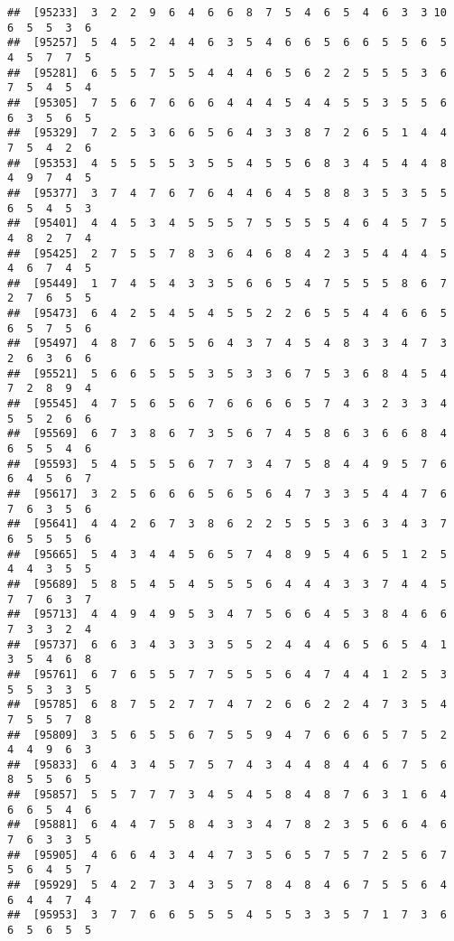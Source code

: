 \documentclass[
]{book}
\begin{document}
\begin{verbatim}
##  [95233]  3  2  2  9  6  4  6  6  8  7  5  4  6  5  4  6  3  3 10  6  5  5  3  6
##  [95257]  5  4  5  2  4  4  6  3  5  4  6  6  5  6  6  5  5  6  5  4  5  7  7  5
##  [95281]  6  5  5  7  5  5  4  4  4  6  5  6  2  2  5  5  5  3  6  7  5  4  5  4
##  [95305]  7  5  6  7  6  6  6  4  4  4  5  4  4  5  5  3  5  5  6  6  3  5  6  5
##  [95329]  7  2  5  3  6  6  5  6  4  3  3  8  7  2  6  5  1  4  4  7  5  4  2  6
##  [95353]  4  5  5  5  5  3  5  5  4  5  5  6  8  3  4  5  4  4  8  4  9  7  4  5
##  [95377]  3  7  4  7  6  7  6  4  4  6  4  5  8  8  3  5  3  5  5  6  5  4  5  3
##  [95401]  4  4  5  3  4  5  5  5  7  5  5  5  5  4  6  4  5  7  5  4  8  2  7  4
##  [95425]  2  7  5  5  7  8  3  6  4  6  8  4  2  3  5  4  4  4  5  4  6  7  4  5
##  [95449]  1  7  4  5  4  3  3  5  6  6  5  4  7  5  5  5  8  6  7  2  7  6  5  5
##  [95473]  6  4  2  5  4  5  4  5  5  2  2  6  5  5  4  4  6  6  5  6  5  7  5  6
##  [95497]  4  8  7  6  5  5  6  4  3  7  4  5  4  8  3  3  4  7  3  2  6  3  6  6
##  [95521]  5  6  6  5  5  5  3  5  3  3  6  7  5  3  6  8  4  5  4  7  2  8  9  4
##  [95545]  4  7  5  6  5  6  7  6  6  6  6  5  7  4  3  2  3  3  4  5  5  2  6  6
##  [95569]  6  7  3  8  6  7  3  5  6  7  4  5  8  6  3  6  6  8  4  6  5  5  4  6
##  [95593]  5  4  5  5  5  6  7  7  3  4  7  5  8  4  4  9  5  7  6  6  4  5  6  7
##  [95617]  3  2  5  6  6  6  5  6  5  6  4  7  3  3  5  4  4  7  6  7  6  3  5  6
##  [95641]  4  4  2  6  7  3  8  6  2  2  5  5  5  3  6  3  4  3  7  6  5  5  5  6
##  [95665]  5  4  3  4  4  5  6  5  7  4  8  9  5  4  6  5  1  2  5  4  4  3  5  5
##  [95689]  5  8  5  4  5  4  5  5  5  6  4  4  4  3  3  7  4  4  5  7  7  6  3  7
##  [95713]  4  4  9  4  9  5  3  4  7  5  6  6  4  5  3  8  4  6  6  7  3  3  2  4
##  [95737]  6  6  3  4  3  3  3  5  5  2  4  4  4  6  5  6  5  4  1  3  5  4  6  8
##  [95761]  6  7  6  5  5  7  7  5  5  5  6  4  7  4  4  1  2  5  3  5  5  3  3  5
##  [95785]  6  8  7  5  2  7  7  4  7  2  6  6  2  2  4  7  3  5  4  7  5  5  7  8
##  [95809]  3  5  6  5  5  6  7  5  5  9  4  7  6  6  6  5  7  5  2  4  4  9  6  3
##  [95833]  6  4  3  4  5  7  5  7  4  3  4  4  8  4  4  6  7  5  6  8  5  5  6  5
##  [95857]  5  5  7  7  7  3  4  5  4  5  8  4  8  7  6  3  1  6  4  6  6  5  4  6
##  [95881]  6  4  4  7  5  8  4  3  3  4  7  8  2  3  5  6  6  4  6  7  6  3  3  5
##  [95905]  4  6  6  4  3  4  4  7  3  5  6  5  7  5  7  2  5  6  7  5  6  4  5  7
##  [95929]  5  4  2  7  3  4  3  5  7  8  4  8  4  6  7  5  5  6  4  6  4  4  7  4
##  [95953]  3  7  7  6  6  5  5  5  4  5  5  3  3  5  7  1  7  3  6  6  5  6  5  5

\end{verbatim}
\end{document}
